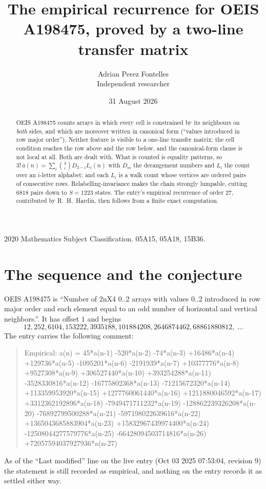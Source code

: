 \documentclass[11pt,a4paper]{article}
\title{The empirical recurrence for OEIS A198475, proved by a two-line transfer matrix}
\author{Adrian Perez Fontelles\\ \small Independent researcher}
\date{31 August 2026}
\theoremstyle{plain}
\theoremstyle{definition}
\begin{document}
\maketitle

\begin{abstract}
OEIS A198475 counts arrays in which every cell is constrained by its neighbours on \emph{both}
sides, and which are moreover written in canonical form (``values introduced in row major
order''). Neither feature is visible to a one-line transfer matrix: the cell condition
reaches the row above and the row below, and the canonical-form clause is not local at
all. Both are dealt with. What is counted is equality patterns, so
$3!\,a(n)=\sum_i\binom{3}{i}D_{3-i}L_i(n)$ with $D_m$ the derangement numbers and
$L_i$ the count over an $i$-letter alphabet; and each $L_i$ is a walk count whose vertices
are ordered pairs of consecutive rows. Relabelling-invariance makes the chain strongly
lumpable, cutting $6818$ pairs down to $S=1223$ states. The entry's empirical recurrence of
order $27$, contributed by R.~H.~Hardin, then follows from a finite exact computation.
\end{abstract}

\noindent\small 2020 Mathematics Subject Classification. 05A15, 05A18, 15B36.\normalsize

\section{The sequence and the conjecture}

OEIS A198475 is ``Number of 2nX4 0..2 arrays with values 0..2 introduced in row major order and each element equal to an odd number of horizontal and vertical neighbors.''. It has offset $1$ and begins
\[
12, 252, 6104, 153222, 3935188, 101884208, 2646874462, 68861880812,\ \dots
\]
The entry carries the following comment:
\begin{quote}\small
Empirical: a(n) = 45*a(n-1) -520*a(n-2) -74*a(n-3) +16486*a(n-4) +129736*a(n-5) -1095201*a(n-6) -2191939*a(n-7) +10377776*a(n-8) +9527308*a(n-9) +306527440*a(n-10) +393254288*a(n-11) -3528330816*a(n-12) -16775802368*a(n-13) -71215672320*a(n-14) +113359953920*a(n-15) +1277760061440*a(n-16) +1211880046592*a(n-17) +3312362192896*a(n-18) -7949471711232*a(n-19) -128862239326208*a(n-20) -76892799500288*a(n-21) -597198022639616*a(n-22) +1365043685883904*a(n-23) +15832967439974400*a(n-24) -12508044277579776*a(n-25) -66428094503714816*a(n-26) +72057594037927936*a(n-27)
\end{quote}
As of the ``Last modified'' line on the live entry (Oct 03 2025 07:53:04, revision 9) the statement is
still recorded as empirical, and nothing on the entry records it as settled either way.
\end{document}

